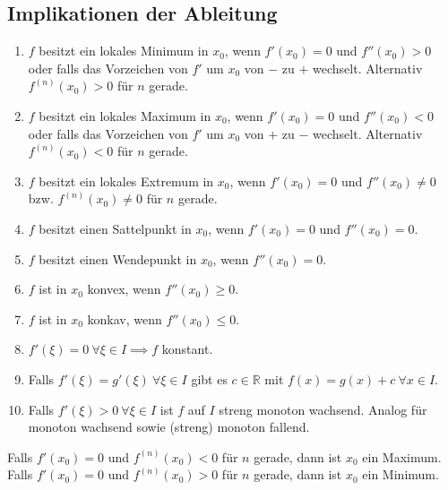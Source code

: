 \documentclass[a4paper,10pt]{article}
\begin{document}
\subsection{Implikationen der Ableitung}
\begin{enumerate}
  \item $f$ besitzt ein lokales Minimum in $x_0$, wenn $f'(x_0) = 0$ und $f''(x_0) > 0$ oder falls das Vorzeichen von $f'$ um $x_0$ von $-$ zu $+$ wechselt. Alternativ $f^{(n)}(x_0) > 0$ für $n$ gerade.
  \item $f$ besitzt ein lokales Maximum in $x_0$, wenn $f'(x_0) = 0$ und $f''(x_0) < 0$ oder falls das Vorzeichen von $f'$ um $x_0$ von $+$ zu $-$ wechselt. Alternativ $f^{(n)}(x_0) < 0$ für $n$ gerade.
  \item $f$ besitzt ein lokales Extremum in $x_0$, wenn $f'(x_0) = 0$ und $f''(x_0) \ne 0$ bzw. $f^{(n)}(x_0) \neq 0$ für $n$ gerade.
  \item $f$ besitzt einen Sattelpunkt in $x_0$, wenn $f'(x_0) = 0$ und $f''(x_0) = 0$.
  \item $f$ besitzt einen Wendepunkt in $x_0$, wenn $f''(x_0) = 0$.
  \item $f$ ist in $x_0$ konvex, wenn $f''(x_0) \ge 0$.
  \item $f$ ist in $x_0$ konkav, wenn $f''(x_0) \le 0$.
  \item $f'(\xi) = 0 \ \forall \xi \in I \implies f$ konstant.
  \item Falls $f'(\xi) = g'(\xi) \ \forall \xi \in I$ gibt es $c \in \mathbb{R}$ mit $f(x) = g(x) + c \ \forall x \in I$.
  \item Falls $f'(\xi) > 0 \ \forall \xi \in I$ ist $f$ auf $I$ streng monoton wachsend. Analog für monoton wachsend sowie (streng) monoton fallend.
\end{enumerate}

Falls $f'(x_0) = 0$ und $f^{(n)}(x_0) < 0$ für $n$ gerade, dann ist $x_0$ ein Maximum.\\
Falls $f'(x_0) = 0$ und $f^{(n)}(x_0) > 0$ für $n$ gerade, dann ist $x_0$ ein Minimum.
\end{document}

